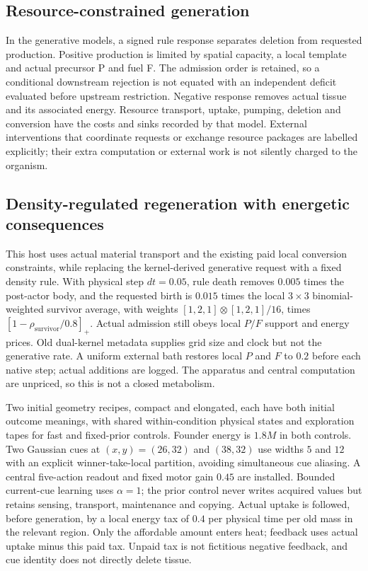 \subsection*{Resource-constrained generation}

In the generative models, a signed rule response separates deletion from requested production. Positive production is limited by spatial capacity, a local template and actual precursor P and fuel F. The admission order is retained, so a conditional downstream rejection is not equated with an independent deficit evaluated before upstream restriction. Negative response removes actual tissue and its associated energy. Resource transport, uptake, pumping, deletion and conversion have the costs and sinks recorded by that model. External interventions that coordinate requests or exchange resource packages are labelled explicitly; their extra computation or external work is not silently charged to the organism.


\subsection*{Density-regulated regeneration with energetic consequences}

This host uses actual material transport and the existing paid local conversion constraints, while replacing the kernel-derived generative request with a fixed density rule. With physical step $dt=0.05$, rule death removes $0.005$ times the post-actor body, and the requested birth is $0.015$ times the local $3\times3$ binomial-weighted survivor average, with weights $[1,2,1]\otimes[1,2,1]/16$, times $[1-\rho_{\mathrm{survivor}}/0.8]_+$. Actual admission still obeys local $P/F$ support and energy prices. Old dual-kernel metadata supplies grid size and clock but not the generative rate. A uniform external bath restores local $P$ and $F$ to $0.2$ before each native step; actual additions are logged. The apparatus and central computation are unpriced, so this is not a closed metabolism.

Two initial geometry recipes, compact and elongated, each have both initial outcome meanings, with shared within-condition physical states and exploration tapes for fast and fixed-prior controls. Founder energy is $1.8M$ in both controls. Two Gaussian cues at $(x,y)=(26,32)$ and $(38,32)$ use widths $5$ and $12$ with an explicit winner-take-local partition, avoiding simultaneous cue aliasing. A central five-action readout and fixed motor gain $0.45$ are installed. Bounded current-cue learning uses $\alpha=1$; the prior control never writes acquired values but retains sensing, transport, maintenance and copying. Actual uptake is followed, before generation, by a local energy tax of $0.4$ per physical time per old mass in the relevant region. Only the affordable amount enters heat; feedback uses actual uptake minus this paid tax. Unpaid tax is not fictitious negative feedback, and cue identity does not directly delete tissue.

